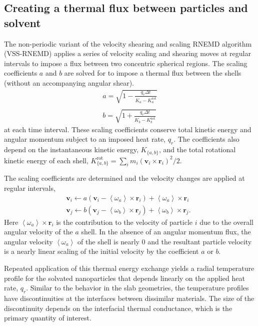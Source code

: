 \subsection{Creating a thermal flux between particles and solvent}

The non-periodic variant of the velocity shearing and scaling RNEMD
algorithm (VSS-RNEMD)\cite{Stocker:2014qq} applies a series of
velocity scaling and shearing moves at regular intervals to impose a
flux between two concentric spherical regions. The scaling coefficients 
$a$ and $b$ are solved for to impose a thermal
flux between the shells (without an accompanying angular shear).
\begin{eqnarray}
	a = \sqrt{1 - \frac{q_r \Delta t}{K_a - K_a^\mathrm{rot}}}\\ \nonumber\\
	b = \sqrt{1 + \frac{q_r \Delta t}{K_b - K_b^\mathrm{rot}}}
\end{eqnarray}
at each time interval.  These scaling coefficients conserve total
kinetic energy and angular momentum subject to an imposed heat rate,
$q_r$.  The coefficients also depend on the instantaneous kinetic
energy, $K_{\{a,b\}}$, and the total rotational kinetic energy of each
shell, $K_{\{a,b\}}^\mathrm{rot} = \sum_i m_i \left( \mathbf{v}_i
  \times \mathbf{r}_i \right)^2 / 2$.

The scaling coefficients are determined and the velocity changes are
applied at regular intervals, 
\begin{eqnarray}
	\mathbf{v}_i \leftarrow a \left ( \mathbf{v}_i - \left < \omega_a \right > \times \mathbf{r}_i \right ) + \left < \omega_a \right > \times \mathbf{r}_i~~\:\\
	\mathbf{v}_j \leftarrow b \left ( \mathbf{v}_j - \left < \omega_b \right > \times \mathbf{r}_j \right ) + \left < \omega_b \right > \times \mathbf{r}_j.
\end{eqnarray}
Here $\left < \omega_a \right > \times \mathbf{r}_i$ is the
contribution to the velocity of particle $i$ due to the overall
angular velocity of the $a$ shell. In the absence of an angular
momentum flux, the angular velocity $\left < \omega_a \right >$ of the
shell is nearly 0 and the resultant particle velocity is a nearly
linear scaling of the initial velocity by the coefficient $a$ or $b$.

Repeated application of this thermal energy exchange yields a radial
temperature profile for the solvated nanoparticles that depends
linearly on the applied heat rate, $q_r$. Similar to the behavior in
the slab geometries, the temperature profiles have discontinuities at
the interfaces between dissimilar materials.  The size of the
discontinuity depends on the interfacial thermal conductance, which is
the primary quantity of interest.

